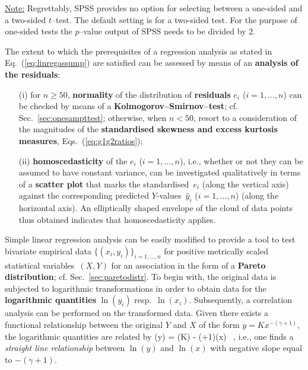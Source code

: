 \medskip
\noindent
\underline{Note:} Regrettably, SPSS provides no option for 
selecting between a one-sided and a two-sided $t$--test. The 
default setting is for a two-sided test. For the purpose of 
one-sided tests the $p$--value output of SPSS needs to be divided 
by $2$.

\medskip
\noindent
The extent to which the prerequisites of a regression analysis as 
stated in Eq.~(\ref{eq:linregassump}) are satisfied can be 
assessed by means of an \textbf{analysis of the residuals}:
%
\begin{itemize}

\item[(i)] for $n \geq 50$, \textbf{normality} of the distribution
of \textbf{residuals} $e_{i}$ ($i=1, \ldots, n$) can be checked by
means of a \textbf{Kolmogorov--Smirnov--test}; cf. 
Sec.~\ref{sec:onesampttest}; otherwise, when $n < 50$, resort to a 
consideration of the magnitudes of the \textbf{standardised
skewness and excess kurtosis measures}, Eqs.~(\ref{eq:g1g2ratios});

\item[(ii)] \textbf{homoscedasticity} of the $e_{i}$ ($i=1, \ldots, 
n$), i.e., whether or not they can be assumed to have constant 
variance, can be investigated qualitatively in terms of a
\textbf{scatter plot} that marks the standardised~$e_{i}$ (along
the vertical axis) against the corresponding predicted 
$Y$-values~$\hat{y}_{i}$ ($i=1, \ldots, n$) (along the horizontal 
axis). An elliptically shaped envelope of the cloud of data points 
thus obtained indicates that homoscedasticity applies.
\end{itemize}
%

\medskip
\noindent
Simple linear regression analysis can be easily modified to 
provide a tool to test bivariate empirical data 
$\{(x_{i},y_{i})\}_{i=1,\ldots,n}$ for positive metrically scaled 
statistical variables~$(X,Y)$ for an association in the form of a 
\textbf{Pareto distribution}; cf. Sec.~\ref{sec:paretodistr}. To
begin with, the original data is subjected to logarithmic 
transformations in order to obtain data for the \textbf{logarithmic 
quantities} $\ln(y_{i})$ resp.~$\ln(x_{i})$. Subsequently, a 
correlation analysis can be performed on the transformed data. 
Given there exists a functional relationship between the original 
$Y$ and $X$ of the form $y=Kx^{-(\gamma+1)}$, the logarithmic 
quantities are related by
%
\be
\ln(y) = \ln(K) - (\gamma+1)\times\ln(x) \ ,
\ee
%
i.e., one finds a \textit{straight line relationship} between 
$\ln(y)$ and $\ln(x)$ with negative slope equal to $-(\gamma+1)$.

